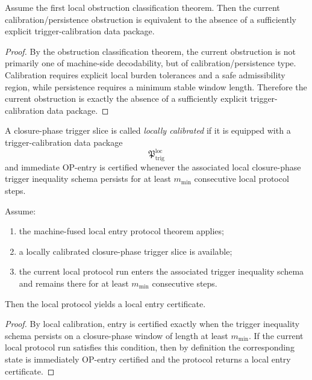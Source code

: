 \begin{proposition}
\label{prop:what-the-current-obstruction-is-really-asking-for}
Assume the first local obstruction classification theorem.
Then the current calibration/persistence obstruction is equivalent to the absence of a sufficiently explicit trigger-calibration data package.
\end{proposition}

\begin{proof}
By the obstruction classification theorem, the current obstruction is not primarily one of machine-side decodability, but of calibration/persistence type.
Calibration requires explicit local burden tolerances and a safe admissibility region, while persistence requires a minimum stable window length.
Therefore the current obstruction is exactly the absence of a sufficiently explicit trigger-calibration data package.
\end{proof}

\begin{definition}
\label{def:locally-calibrated-closure-phase-trigger-slice}
A closure-phase trigger slice is called \emph{locally calibrated} if it is equipped with a trigger-calibration data package
\[
\mathfrak{P}_{\mathrm{trig}}^{\mathrm{loc}}
\]
and immediate OP-entry is certified whenever the associated local closure-phase trigger inequality schema persists for at least \(m_{\min}\) consecutive local protocol steps.
\end{definition}

\begin{lemma}
\label{lem:first-local-calibration-to-entry-lemma}
Assume:
\begin{enumerate}
    \item the machine-fused local entry protocol theorem applies;
    \item a locally calibrated closure-phase trigger slice is available;
    \item the current local protocol run enters the associated trigger inequality schema and remains there for at least \(m_{\min}\) consecutive steps.
\end{enumerate}
Then the local protocol yields a local entry certificate.
\end{lemma}

\begin{proof}
By local calibration, entry is certified exactly when the trigger inequality schema persists on a closure-phase window of length at least \(m_{\min}\).
If the current local protocol run satisfies this condition, then by definition the corresponding state is immediately OP-entry certified and the protocol returns a local entry certificate.
\end{proof}

